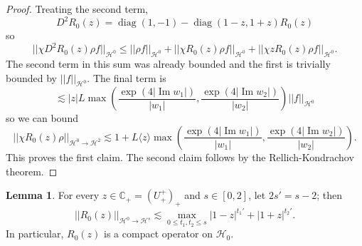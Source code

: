 \documentclass[12pt]{report}
\newcommand{\CC}{\mathbb{C}}
\DeclareMathOperator{\diag}{diag}
\renewcommand{\Im}{\operatorname{Im}}
\theoremstyle{definition}
\newtheorem{lemma}[theorem]{Lemma}
\begin{document}
\begin{proof}
Treating the second term,
$$D^2R_0(z) = \diag(1, - 1) - \diag(1-z,1+z)R_0(z)$$
so
$$||\chi D^2 R_0(z) \rho f||_{\mathcal H^0} \leq ||\rho f||_{\mathcal H^0} + ||\chi R_0(z) \rho f||_{\mathcal H^0} + ||\chi z R_0(z) \rho f||_{\mathcal H^0}.$$
The second term in this sum was already bounded and the first is trivially bounded by $||f||_{\mathcal H^0}$.
The final term is
$$\lesssim |z|L \max\left(\frac{\exp(4 |\Im w_1|)}{|w_1|}, \frac{\exp(4 |\Im w_2|)}{|w_2|} \right) ||f||_{\mathcal H^0}$$
so we can bound
$$||\chi R_0(z) \rho||_{\mathcal H^0 \to \mathcal H^2} \lesssim 1 + L\langle z\rangle\max\left(\frac{\exp(4 |\Im w_1|)}{|w_1|}, \frac{\exp(4 |\Im w_2|)}{|w_2|} \right).$$
This proves the first claim.
The second claim follows by the Rellich-Kondrachov theorem.
\end{proof}

\begin{lemma}
\label{sharp bound on upper half free resolvent}
For every $z \in \CC_+ = (U_+^+)_+$ and $s \in [0, 2]$, let $2s' = s - 2$; then
$$||R_0(z)||_{\mathcal H^0 \to \mathcal H^s} \lesssim \max_{0 \leq t_1,t_2 \leq s} |1-z|^{t_1'} + |1+z|^{t_2'}.$$
In particular, $R_0(z)$ is a compact operator on $\mathcal H_0$.
\end{lemma}
\end{document}
